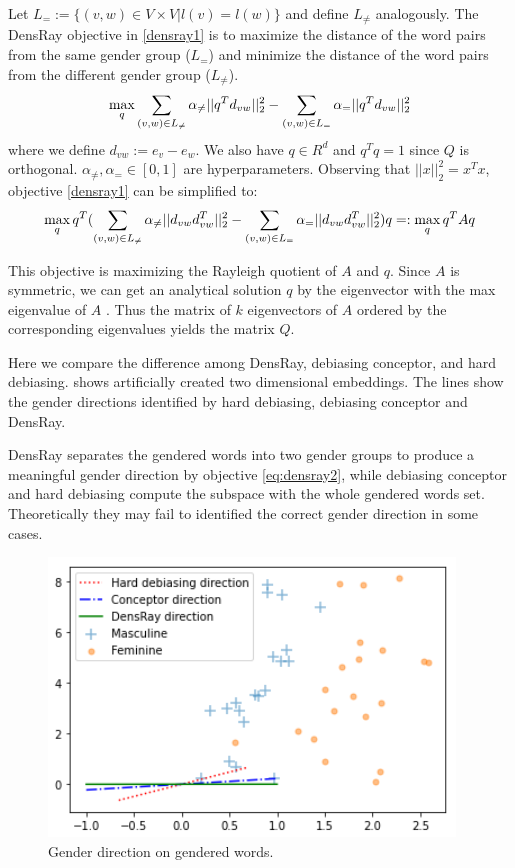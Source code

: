 Let $L_{=}:=\{(v,w)\in V\times V|l(v)=l(w)\}$ and define
$L_{\neq}$ analogously.  The DensRay objective
in \eqref{densray1} is to maximize the distance of the word
pairs from the same gender group ($L_{=}$) and minimize the
distance of the word pairs from the different gender group
($L_{\neq}$).
\begin{eqnarray}
\max\limits_{q} 
\sum_{(v,w)\in L_{\neq}}\alpha_{\neq}||q^Td_{vw}||^2_2
-\sum_{(v,w)\in L_{=}}\alpha_{=}||q^Td_{vw}||^2_2
\eqlabel{densray1}
\end{eqnarray}
where we define $d_{vw}:=e_v-e_w$. We also have $q\in R^d$
and $q^Tq=1$ since $Q$ is orthogonal. $\alpha_{\neq},\alpha_{=}\in [0,1]$ are hyperparameters. Observing that $||x||^2_2=x^Tx$, objective \eqref{densray1} can be simplified to:
\begin{eqnarray}
\max \limits_{q} q^T(
\sum_{(v,w)\in L_{\neq}}\alpha_{\neq}||d_{vw}d_{vw}^T||^2_2-\sum_{(v,w)\in L_{=}}\alpha_{=}||d_{vw}d_{vw}^T||^2_2)q=:\max\limits_{q} q^TAq
\eqlabel{eq:densray2}
\end{eqnarray}

This objective is maximizing the Rayleigh quotient of $A$ and $q$. Since $A$ is symmetric, we can get an analytical solution $q$ by the eigenvector with the max eigenvalue of $A$ . Thus the matrix of $k$ eigenvectors of $A$ ordered by the corresponding eigenvalues yields the matrix $Q$.

Here we compare the difference among DensRay, debiasing conceptor, and hard debiasing.  shows artificially created two dimensional embeddings. The lines show the gender directions identified by hard debiasing, debiasing conceptor and DensRay. 

DensRay separates the gendered words into two gender groups to produce a meaningful gender direction by objective \eqref{eq:densray2}, while debiasing conceptor and hard debiasing compute the subspace with the whole gendered words set. Theoretically they may fail to identified the correct gender direction in some cases. 



\begin{figure}[h]
	\centering
	\includegraphics[width=0.5\linewidth]{examples.png}
	\caption{Gender direction on gendered words.}
\end{figure}

